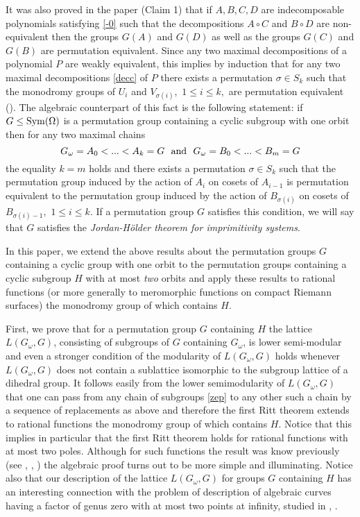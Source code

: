 \documentclass{amsart}
\begin{document}
It was also proved in the paper \cite{mu} (Claim 1) that if $A,B,C,D$ are indecomposable polynomials satisfying
\eqref{-0} such that the decompositions $A\circ C$ and $B\circ D$ are non-equivalent then
the groups $G(A)$ and $G(D)$ as well as the groups $G(C)$ and $G(B)$ are permutation equivalent.
Since any two maximal decompositions of a polynomial $P$
are weakly equivalent, this implies by induction that for any two maximal decompositions \eqref{decc} of $P$
there exists a permutation $\sigma\in S_k$ such that the monodromy groups of $U_i$ and $V_{\sigma(i)},$
$1\leq i \leq k,$ are permutation equivalent (\cite{mz}).
The algebraic counterpart of this fact is the following
statement: if $G\leq {\rm Sym}(\Omega)$ is a permutation group containing a cyclic subgroup with one orbit then
for any two maximal chains
$$G_{\omega}=A_0 < ... < A_k=G\ \ {\rm and}\ \ G_{\omega}=B_0 < ... < B_m=G$$
the equality $k=m$ holds and
there exists a permutation $\sigma\in S_k$ such that the
permutation group
induced by the action of $A_i$ on cosets of $A_{i-1}$ is permutation equivalent
to the
permutation group induced by the action of
$B_{\sigma(i)}$ on cosets of $B_{\sigma(i)-1},$ $1\leq i \leq k.$
If a permutation group $G$ satisfies this condition,
we will say that $G$ satisfies the
{\it Jordan-H{\" o}lder theorem for imprimitivity systems}.

In this paper, we extend the above results about the permutation groups $G$ containing a cyclic group with one orbit
to the permutation groups
containing a cyclic subgroup $H$ with at most {\it two} orbits and apply these results to
rational functions (or more generally to meromorphic functions on compact Riemann surfaces)
the monodromy group of which contains $H.$

First, we prove that
for a permutation group $G$ containing $H$ the lattice $L(G_{\omega},G)$, consisting of subgroups of $G$ containing $G_{\omega}$, is
lower semi-modular and even a stronger condition of the modularity of $L(G_{\omega},G)$ holds
whenever $L(G_{\omega},G)$ does not contain a sublattice isomorphic to the subgroup lattice of
a dihedral group.
It follows easily from the lower semimodularity of $L(G_{\omega},G)$ that one can pass from any chain of subgroups \eqref{zep} to any other such a chain by a sequence of replacements as above and therefore the first Ritt theorem extends to rational functions the monodromy group of which contains $H$. Notice that this implies in
particular that the first Ritt theorem holds
for rational functions with at most two poles. Although for such functions the result was know
previously (see \cite{ar}, \cite{pak}, \cite{zi}) the algebraic proof turns out to be more simple
and illuminating. Notice also that our description of the lattice $L(G_{\omega},G)$ for groups $G$ containing $H$
has an interesting connection with the problem of description
of algebraic curves having a factor of genus zero with at most two points at infinity,
studied in \cite{f1}, \cite{bilu}.
\end{document}
